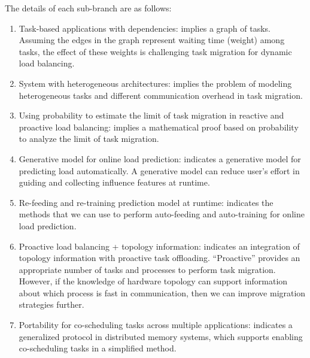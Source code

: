 The details of each sub-branch are as follows:


\begin{enumerate}[label=(\arabic*)]
	\item Task-based applications with dependencies: implies a graph of tasks. Assuming the edges in the graph represent waiting time (weight) among tasks, the effect of these weights is challenging task migration for dynamic load balancing.
	\item System with heterogeneous architectures: implies the problem of modeling heterogeneous tasks and different communication overhead in task migration.
	\item Using probability to estimate the limit of task migration in reactive and proactive load balancing: implies a mathematical proof based on probability to analyze the limit of task migration.


	\item Generative model for online load prediction: indicates a generative model for predicting load automatically. A generative model can reduce user's effort in guiding and collecting influence features at runtime.
	\item Re-feeding and re-training prediction model at runtime: indicates the methods that we can use to perform auto-feeding and auto-training for online load prediction.
	\item Proactive load balancing + topology information: indicates an integration of topology information with proactive task offloading. ``Proactive'' provides an appropriate number of tasks and processes to perform task migration. However, if the knowledge of hardware topology can support information about which process is fast in communication, then we can improve migration strategies further.
	\item Portability for co-scheduling tasks across multiple applications: indicates a generalized protocol in distributed memory systems, which supports enabling co-scheduling tasks in a simplified method.
\end{enumerate}

